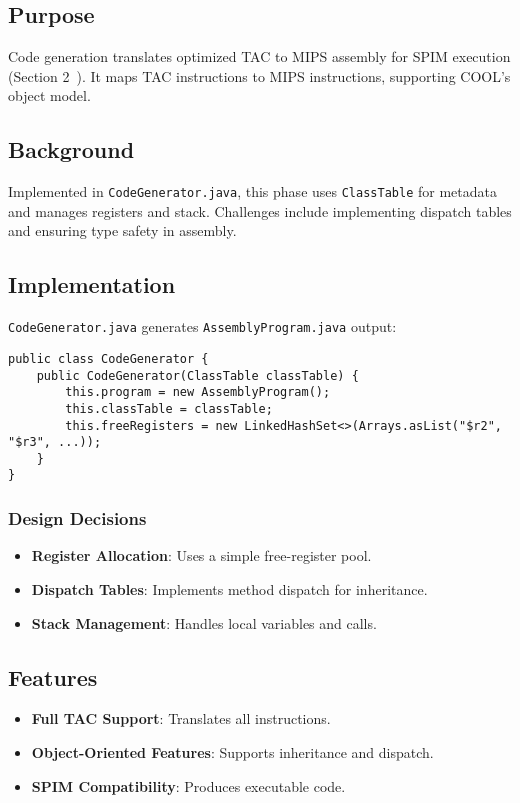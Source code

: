 \documentclass[11pt, titlepage]{article}
\begin{document}
\subsection{Purpose}
Code generation translates optimized TAC to MIPS assembly for SPIM execution (Section 2~\cite{cool_manual}). It maps TAC instructions to MIPS instructions, supporting COOL's object model.

\subsection{Background}
Implemented in \texttt{CodeGenerator.java}, this phase uses \texttt{ClassTable} for metadata and manages registers and stack. Challenges include implementing dispatch tables and ensuring type safety in assembly.

\subsection{Implementation}
\texttt{CodeGenerator.java} generates \texttt{AssemblyProgram.java} output:

\begin{lstlisting}
public class CodeGenerator {
    public CodeGenerator(ClassTable classTable) {
        this.program = new AssemblyProgram();
        this.classTable = classTable;
        this.freeRegisters = new LinkedHashSet<>(Arrays.asList("$r2", "$r3", ...));
    }
}
\end{lstlisting}

\subsubsection{Design Decisions}

\begin{itemize}[leftmargin=*]
    \item \textbf{Register Allocation}: Uses a simple free-register pool.
    \item \textbf{Dispatch Tables}: Implements method dispatch for inheritance.
    \item \textbf{Stack Management}: Handles local variables and calls.
\end{itemize}


\subsection{Features}
\begin{itemize}[leftmargin=*]
    \item \textbf{Full TAC Support}: Translates all instructions.
    \item \textbf{Object-Oriented Features}: Supports inheritance and dispatch.
    \item \textbf{SPIM Compatibility}: Produces executable code.
\end{itemize}
\end{document}
